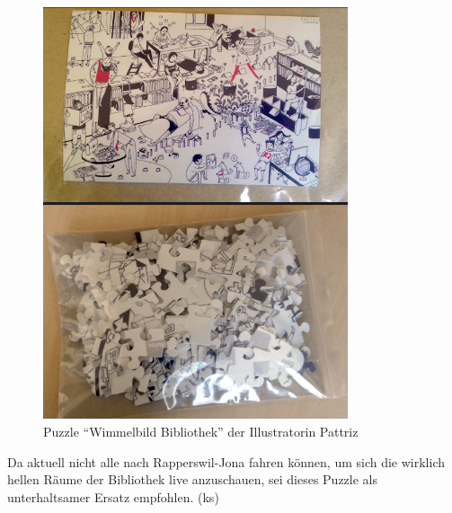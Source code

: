\documentclass[a4paper,
fontsize=11pt,
oneside,
numbers=noperiodatend,
parskip=half-,
bibliography=totoc,
final
]{scrartcl}
\begin{document}
\begin{figure}[ht!]
\centering
\includegraphics[width=0.8\textwidth]{img/puzzle-wimmelbild_bibliothek.jpg}
\caption{Puzzle ``Wimmelbild Bibliothek'' der Illustratorin Pattriz}
\end{figure}

Da aktuell nicht alle nach Rapperswil-Jona fahren können, um sich die
wirklich hellen Räume der Bibliothek live anzuschauen, sei dieses Puzzle
als unterhaltsamer Ersatz empfohlen. (ks)

\end{document}
